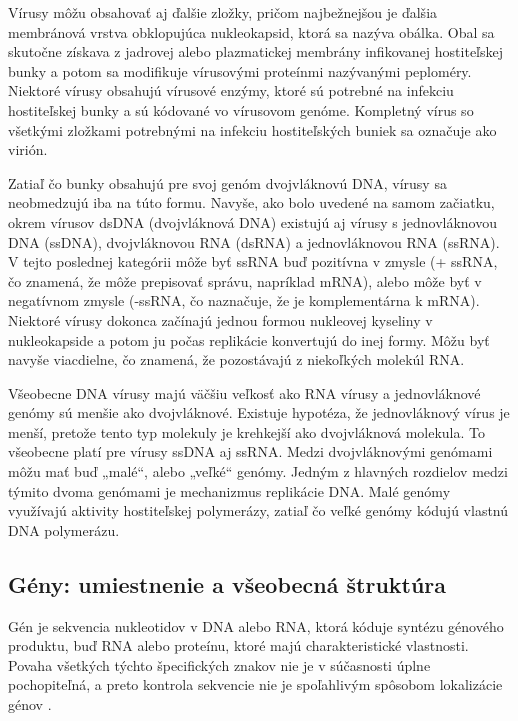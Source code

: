 Vírusy môžu obsahovať aj ďalšie zložky, pričom najbežnejšou je ďalšia membránová vrstva obklopujúca nukleokapsid, ktorá sa nazýva obálka.
Obal sa skutočne získava z jadrovej alebo plazmatickej membrány infikovanej hostiteľskej bunky a potom sa modifikuje vírusovými proteínmi nazývanými peploméry.
Niektoré vírusy obsahujú vírusové enzýmy, ktoré sú potrebné na infekciu hostiteľskej bunky a sú kódované vo vírusovom genóme.
Kompletný vírus so všetkými zložkami potrebnými na infekciu hostiteľských buniek sa označuje ako virión.

Zatiaľ čo bunky obsahujú pre svoj genóm dvojvláknovú DNA, vírusy sa neobmedzujú iba na túto formu.
Navyše, ako bolo uvedené na samom začiatku, okrem vírusov dsDNA (dvojvláknová DNA) existujú aj vírusy s jednovláknovou DNA (ssDNA), dvojvláknovou RNA (dsRNA) a jednovláknovou RNA (ssRNA).
V tejto poslednej kategórii môže byť ssRNA buď pozitívna v zmysle (+ ssRNA, čo znamená, že môže prepisovať správu, napríklad mRNA), alebo môže byť v negatívnom zmysle (-ssRNA, čo naznačuje, že je komplementárna k mRNA). Niektoré vírusy dokonca začínajú jednou formou nukleovej kyseliny v nukleokapside a potom ju počas replikácie konvertujú do inej formy.
Môžu byť navyše viacdielne, čo znamená, že pozostávajú z niekoľkých molekúl RNA.

Všeobecne DNA vírusy majú väčšiu veľkosť ako RNA vírusy a jednovláknové genómy sú menšie ako dvojvláknové.
Existuje hypotéza, že jednovláknový vírus je menší, pretože tento typ molekuly je krehkejší ako dvojvláknová molekula.
To všeobecne platí pre vírusy ssDNA aj ssRNA.
Medzi dvojvláknovými genómami môžu mať buď „malé“, alebo „veľké“ genómy.
Jedným z hlavných rozdielov medzi týmito dvoma genómami je mechanizmus replikácie DNA.
Malé genómy využívajú aktivity hostiteľskej polymerázy, zatiaľ čo veľké genómy kódujú vlastnú DNA polymerázu.

\subsection{Gény: umiestnenie a všeobecná štruktúra}
Gén je sekvencia nukleotidov v DNA alebo RNA, ktorá kóduje syntézu génového produktu, buď RNA alebo proteínu, ktoré majú charakteristické vlastnosti.
Povaha všetkých týchto špecifických znakov nie je v súčasnosti úplne pochopiteľná, a preto kontrola sekvencie nie je spoľahlivým spôsobom lokalizácie génov \cite{Genomes3}.

